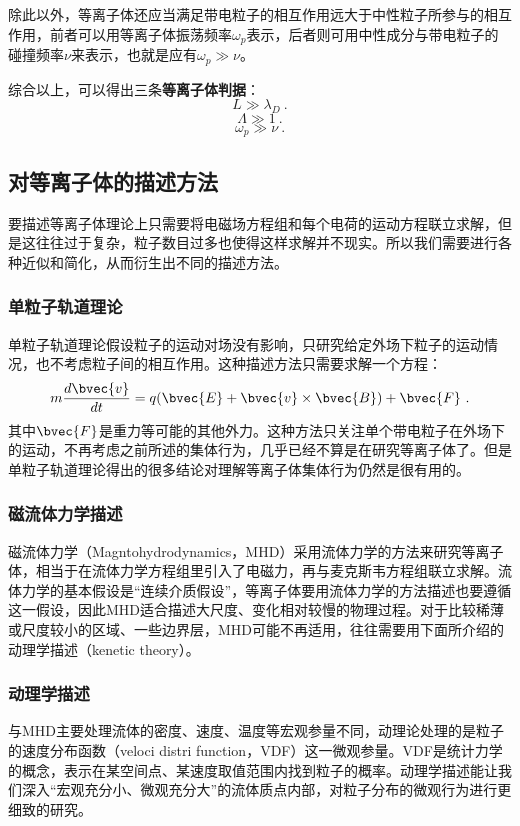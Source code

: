 除此以外，等离子体还应当满足带电粒子的相互作用远大于中性粒子所参与的相互作用，前者可以用等离子体振荡频率$\omega_p$表示，后者则可用中性成分与带电粒子的碰撞频率$\nu$来表示，也就是应有$\omega_p\gg\nu$。
		
综合以上，可以得出三条\textbf{等离子体判据}：
		\begin{equation} 
		L\gg \lambda_D~.
		\end{equation}
		\begin{equation} 
		\varLambda\gg1~.
		\end{equation}
		\begin{equation} 
		\omega_p\gg\nu~.
		\end{equation}
		
\subsection{对等离子体的描述方法}
		
要描述等离子体理论上只需要将电磁场方程组和每个电荷的运动方程联立求解，但是这往往过于复杂，粒子数目过多也使得这样求解并不现实。所以我们需要进行各种近似和简化，从而衍生出不同的描述方法。
\subsubsection{单粒子轨道理论}
			
单粒子轨道理论假设粒子的运动对场没有影响，只研究给定外场下粒子的运动情况，也不考虑粒子间的相互作用。这种描述方法只需要求解一个方程：
			\begin{equation} 
			m\frac{d\bvec{v}}{dt}=q(\bvec{E}+\bvec{v}\times\bvec{B})+\bvec{F}~.
			\end{equation}
其中$\bvec{F}$是重力等可能的其他外力。这种方法只关注单个带电粒子在外场下的运动，不再考虑之前所述的集体行为，几乎已经不算是在研究等离子体了。但是单粒子轨道理论得出的很多结论对理解等离子体集体行为仍然是很有用的。
			
\subsubsection{磁流体力学描述}
磁流体力学（Magntohydrodynamics，MHD）采用流体力学的方法来研究等离子体，相当于在流体力学方程组里引入了电磁力，再与麦克斯韦方程组联立求解。流体力学的基本假设是“连续介质假设”，等离子体要用流体力学的方法描述也要遵循这一假设，因此MHD适合描述大尺度、变化相对较慢的物理过程。对于比较稀薄或尺度较小的区域、一些边界层，MHD可能不再适用，往往需要用下面所介绍的动理学描述（kenetic theory）。
			
\subsubsection{动理学描述}
与MHD主要处理流体的密度、速度、温度等宏观参量不同，动理论处理的是粒子的速度分布函数（veloci distri function，VDF）这一微观参量。VDF是统计力学的概念，表示在某空间点、某速度取值范围内找到粒子的概率。动理学描述能让我们深入“宏观充分小、微观充分大”的流体质点内部，对粒子分布的微观行为进行更细致的研究。
			

